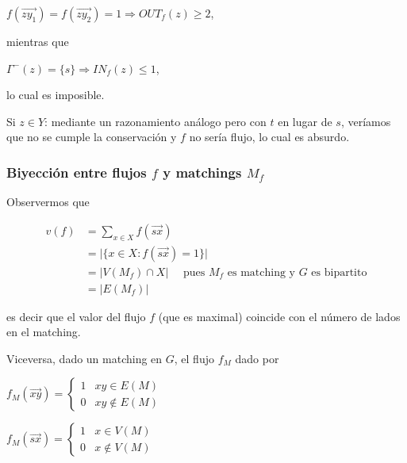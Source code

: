 \documentclass[10pt,a4paper]{article}
\begin{document}
\begin{center}
$f(\overrightarrow{zy_1}) = f(\overrightarrow{zy_2}) = 1 \Rightarrow OUT_f(z) \geq 2 $,
\end{center}

mientras que

\begin{center}
$\Gamma^-(z) = \{s\} \Rightarrow IN_f(z) \leq 1$,
\end{center}

lo cual es imposible.

Si $z \in Y$: mediante un razonamiento análogo pero con $t$ en lugar de $s$, veríamos que no se cumple la conservación y $f$ no sería flujo, lo cual es absurdo.

\subsubsection*{Biyección entre flujos $f$ y matchings $M_f$}

Observermos que

\begin{center}
\begin{align*} v(f) &= \sum\limits_{x\in X} f(\overrightarrow{sx})\\ &=\lvert \{x\in X: f(\overrightarrow{sx}) = 1\}\rvert\\ &= \lvert V(M_f) \cap X\rvert\quad\text{ pues }M_f\text{ es matching y } G \text{ es bipartito}\\ &= \lvert E(M_f)\rvert \end{align*}
\end{center}

es decir que el valor del flujo $f$ (que es maximal) coincide con el número de lados en el matching.

Viceversa, dado un matching en $G$, el flujo $f_M$ dado por

\begin{center}
$f_M (\overrightarrow{xy})= \begin{cases} 1 & xy \in E(M)\\ 0 & xy \not \in E(M) \end{cases}$
\end{center}

\begin{center}
$f_M (\overrightarrow{sx})= \begin{cases} 1 & x \in V(M)\\ 0 & x \not \in V(M) \end{cases}$
\end{center}
\end{document}
